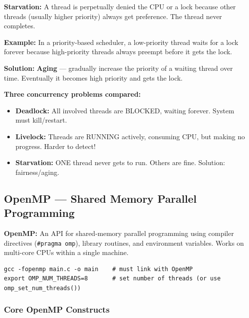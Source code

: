 \documentclass[11pt,a4paper]{article}
\newcommand{\code}[1]{\texttt{\small\colorbox{codebg}{\color{codekw}#1}}}
\newcommand{\term}[1]{\textbf{\color{darkblue}#1}}
\begin{document}
\begin{mydef}
\textbf{Starvation:} A thread is perpetually denied the CPU or a lock because other threads (usually higher priority) always get preference. The thread never completes.
\end{mydef}

\textbf{Example:} In a priority-based scheduler, a low-priority thread waits for a lock forever because high-priority threads always preempt before it gets the lock.

\textbf{Solution:} \term{Aging} --- gradually increase the priority of a waiting thread over time. Eventually it becomes high priority and gets the lock.

\begin{keypoint}
\textbf{Three concurrency problems compared:}
\begin{itemize}[noitemsep]
  \item \textbf{Deadlock:} All involved threads are BLOCKED, waiting forever. System must kill/restart.
  \item \textbf{Livelock:} Threads are RUNNING actively, consuming CPU, but making no progress. Harder to detect!
  \item \textbf{Starvation:} ONE thread never gets to run. Others are fine. Solution: fairness/aging.
\end{itemize}
\end{keypoint}

\subsection{OpenMP --- Shared Memory Parallel Programming}

\begin{mydef}
\textbf{OpenMP:} An API for shared-memory parallel programming using compiler directives (\code{\#pragma omp}), library routines, and environment variables. Works on multi-core CPUs within a single machine.
\end{mydef}

\begin{lstlisting}[style=bashstyle]
gcc -fopenmp main.c -o main    # must link with OpenMP
export OMP_NUM_THREADS=8       # set number of threads (or use omp_set_num_threads())
\end{lstlisting}

\subsubsection{Core OpenMP Constructs}
\end{document}
